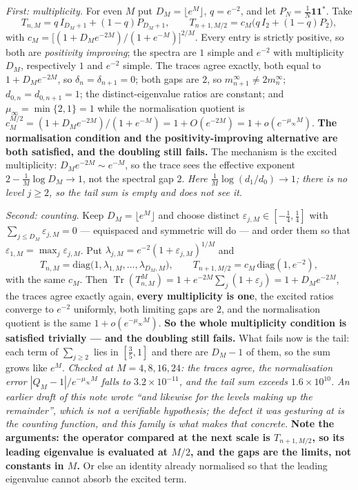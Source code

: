 \documentclass[11pt]{article}
\begin{document}
\begin{itemize}
\emph{First: multiplicity.} For even $M$ put $D_M=\lfloor e^{M}\rfloor$, $q=e^{-2}$, and
let $P_N=\tfrac1N\mathbf1\mathbf1^{*}$. Take
\[
T_{n,M}=q\,I_{D_M+1}+(1-q)P_{D_M+1},\qquad
T_{n+1,M/2}=c_M\bigl(q\,I_2+(1-q)P_2\bigr),
\]
with $c_M=\bigl[(1+D_Me^{-2M})/(1+e^{-M})\bigr]^{2/M}$. Every entry is strictly
positive, so both are \emph{positivity improving}; the spectra are $1$ simple and
$e^{-2}$ with multiplicity $D_M$, respectively $1$ and $e^{-2}$ simple. The traces agree
exactly, both equal to $1+D_Me^{-2M}$, so $\delta_n=\delta_{n+1}=0$; both gaps are $2$,
so $m_{n+1}^\infty\neq2m_n^\infty$; $d_{0,n}=d_{0,n+1}=1$; the distinct-eigenvalue ratios
are constant; and $\mu_\infty=\min\{2,1\}=1$ while the normalisation quotient is
$c_M^{M/2}=(1+D_Me^{-2M})/(1+e^{-M})=1+O(e^{-2M})=1+o(e^{-\mu_\infty M})$.
\textbf{The normalisation condition and the positivity-improving alternative are both
satisfied, and the doubling still fails.} The mechanism is the excited multiplicity:
$D_Me^{-2M}\sim e^{-M}$, so the trace sees the effective exponent
$2-\tfrac1M\log D_M\to1$, not the spectral gap $2$. \emph{Here
$\tfrac1M\log(d_1/d_0)\to1$; there is no level $j\ge2$, so the tail sum is empty and
does not see it.}

\emph{Second: counting.} Keep $D_M=\lfloor e^{M}\rfloor$ and choose distinct
$\varepsilon_{j,M}\in[-\tfrac14,\tfrac14]$ with $\sum_{j\le D_M}\varepsilon_{j,M}=0$ ---
equispaced and symmetric will do --- and order them so that
$\varepsilon_{1,M}=\max_j\varepsilon_{j,M}$. Put
$\lambda_{j,M}=e^{-2}(1+\varepsilon_{j,M})^{1/M}$
and
\[
T_{n,M}=\mathrm{diag}\bigl(1,\lambda_{1,M},\dots,\lambda_{D_M,M}\bigr),\qquad
T_{n+1,M/2}=c_M\,\mathrm{diag}(1,e^{-2}),
\]
with the same $c_M$. Then $\operatorname{Tr}(T_{n,M}^M)=1+e^{-2M}\sum_j(1+\varepsilon_j)
=1+D_Me^{-2M}$, the traces agree exactly again, \textbf{every multiplicity is one},
the excited ratios converge to $e^{-2}$ uniformly, both limiting gaps are $2$, and the
normalisation quotient is the same $1+o(e^{-\mu_\infty M})$. \textbf{So the whole
multiplicity condition is satisfied trivially --- and the doubling still fails.} What
fails now is the tail: each term of $\sum_{j\ge2}$ lies in $[\tfrac35,1]$ and
there are $D_M-1$ of them, so the sum grows like $e^{M}$. \emph{Checked at
$M=4,8,16,24$: the traces agree, the normalisation error
$|Q_M-1|/e^{-\mu_\infty M}$ falls to $3.2\times10^{-11}$, and the tail sum exceeds
$1.6\times10^{10}$.} \emph{An earlier draft of this note wrote ``and likewise for the
levels making up the remainder'', which is not a verifiable hypothesis; the defect it
was gesturing at is the counting function, and this family is what makes that
concrete.} \textbf{Note the
arguments: the operator compared at the next scale is $T_{n+1,M/2}$, so its leading
eigenvalue is evaluated at $M/2$, and the gaps are the limits, not constants in $M$.} Or else an
identity already normalised so that the leading eigenvalue cannot absorb the excited
term.


\end{itemize}
\end{document}
